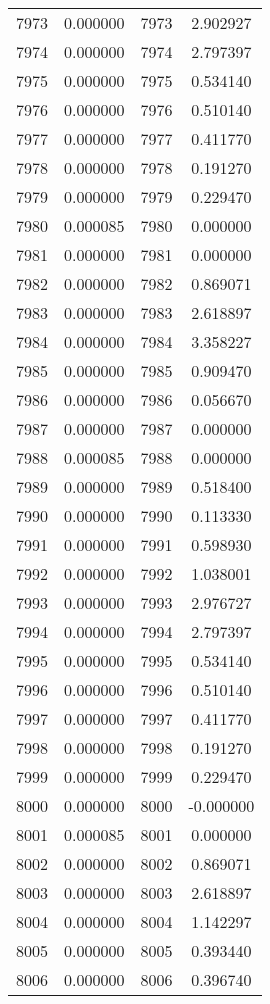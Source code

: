 \documentclass[12pt]{article}
\begin{document}
\begin{longtable}{@{}cccc@{}}
7973 & 0.000000 & 7973 & 2.902927 \\
7974 & 0.000000 & 7974 & 2.797397 \\
7975 & 0.000000 & 7975 & 0.534140 \\
7976 & 0.000000 & 7976 & 0.510140 \\
7977 & 0.000000 & 7977 & 0.411770 \\
7978 & 0.000000 & 7978 & 0.191270 \\
7979 & 0.000000 & 7979 & 0.229470 \\
7980 & 0.000085 & 7980 & 0.000000 \\
7981 & 0.000000 & 7981 & 0.000000 \\
7982 & 0.000000 & 7982 & 0.869071 \\
7983 & 0.000000 & 7983 & 2.618897 \\
7984 & 0.000000 & 7984 & 3.358227 \\
7985 & 0.000000 & 7985 & 0.909470 \\
7986 & 0.000000 & 7986 & 0.056670 \\
7987 & 0.000000 & 7987 & 0.000000 \\
7988 & 0.000085 & 7988 & 0.000000 \\
7989 & 0.000000 & 7989 & 0.518400 \\
7990 & 0.000000 & 7990 & 0.113330 \\
7991 & 0.000000 & 7991 & 0.598930 \\
7992 & 0.000000 & 7992 & 1.038001 \\
7993 & 0.000000 & 7993 & 2.976727 \\
7994 & 0.000000 & 7994 & 2.797397 \\
7995 & 0.000000 & 7995 & 0.534140 \\
7996 & 0.000000 & 7996 & 0.510140 \\
7997 & 0.000000 & 7997 & 0.411770 \\
7998 & 0.000000 & 7998 & 0.191270 \\
7999 & 0.000000 & 7999 & 0.229470 \\
8000 & 0.000000 & 8000 & -0.000000 \\
8001 & 0.000085 & 8001 & 0.000000 \\
8002 & 0.000000 & 8002 & 0.869071 \\
8003 & 0.000000 & 8003 & 2.618897 \\
8004 & 0.000000 & 8004 & 1.142297 \\
8005 & 0.000000 & 8005 & 0.393440 \\
8006 & 0.000000 & 8006 & 0.396740 \\

\end{longtable}
\end{document}
